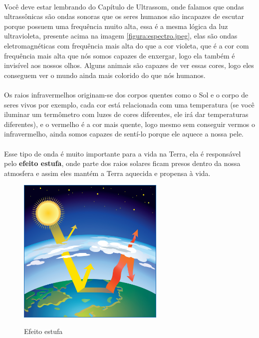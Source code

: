 \paragraph{}
Você deve estar lembrando do Capítulo de Ultrassom, onde falamos que ondas ultrassônicas são ondas sonoras que os seres humanos são incapazes de escutar porque possuem uma frequência muito alta, essa é a mesma lógica da luz ultravioleta, presente acima na imagem \ref{figura:espectro.jpeg}, elas são ondas eletromagnéticas com frequência mais alta do que a cor violeta, que é a cor com frequência mais alta que nós somos capazes de enxergar, logo ela também é invisível aos nossos olhos. Alguns animais são capazes de ver essas cores, logo eles conseguem ver o mundo ainda mais colorido do que nós humanos.
\paragraph{}
Os raios infravermelhos originam-se dos corpos quentes como o Sol e o corpo de seres vivos por exemplo, cada cor está relacionada com uma temperatura (se você iluminar um termômetro com luzes de cores diferentes, ele irá dar temperaturas diferentes), e o vermelho é a cor mais quente, logo mesmo sem conseguir vermos o infravermelho, ainda somos capazes de sentí-lo porque ele aquece a nossa pele.
\paragraph{}
Esse tipo de onda é muito importante para a vida na Terra, ela é responsável pelo \textbf{efeito estufa}, onde parte dos raios solares ficam presos dentro da nossa atmosfera e assim eles mantém a Terra aquecida e propensa à vida.

    \begin{figure}[h]
    \caption{Efeito estufa}
     
    \centering 
    \includegraphics[width=7cm]{Figuras/estufa.jpg}
    \label{figura:estufa.jpeg}
    \end{figure}
    
